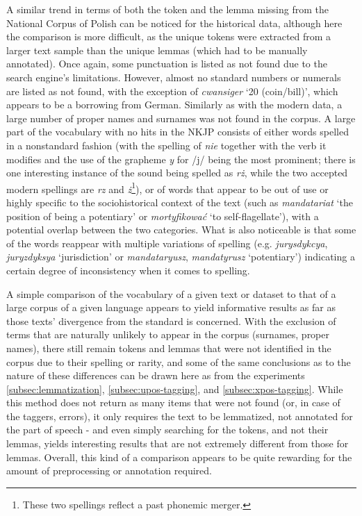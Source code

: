 A similar trend in terms of both the token and the lemma missing from the National Corpus of Polish can be noticed for the historical data, although here the comparison is more difficult, as the unique tokens were extracted from a larger text sample than the unique lemmas (which had to be manually annotated). Once again, some punctuation is listed as not found due to the search engine's limitations. However, almost no standard numbers or numerals are listed as not found, with the exception of \textit{cwansiger} `20 (coin/bill)', which appears to be a borrowing from German. Similarly as with the modern data, a large number of proper names and surnames was not found in the corpus. A large part of the vocabulary with no hits in the NKJP consists of either words spelled in a nonstandard fashion (with the spelling of \textit{nie} together with the verb it modifies and the use of the grapheme \textit{y} for /j/ being the most prominent; there is one interesting instance of the sound \textipa{/\textrtailz/} being spelled as \textit{rż}, while the two accepted modern spellings are \textit{rz} and \textit{ż}\footnote{These two spellings reflect a past phonemic merger.}), or of words that appear to be out of use or highly specific to the sociohistorical context of the text (such as \textit{mandatariat} `the position of being a potentiary' or \textit{mortyfikować} `to self-flagellate'), with a potential overlap between the two categories. What is also noticeable is that some of the words reappear with multiple variations of spelling (e.g. \textit{jurysdykcya}, \textit{juryzdyksya} `jurisdiction' or \textit{mandataryusz}, \textit{mandatyrusz} `potentiary') indicating a certain degree of inconsistency when it comes to spelling.

A simple comparison of the vocabulary of a given text or dataset to that of a large corpus of a given language appears to yield informative results as far as those texts' divergence from the standard is concerned. With the exclusion of terms that are naturally unlikely to appear in the corpus (surnames, proper names), there still remain tokens and lemmas that were not identified in the corpus due to their spelling or rarity, and some of the same conclusions as to the nature of these differences can be drawn here as from the experiments \autoref{subsec:lemmatization}, \autoref{subsec:upos-tagging}, and \autoref{subsec:xpos-tagging}. While this method does not return as many items that were not found (or, in case of the taggers, errors), it only requires the text to be lemmatized, not annotated for the part of speech - and even simply searching for the tokens, and not their lemmas, yields interesting results that are not extremely different from those for lemmas. Overall, this kind of a comparison appears to be quite rewarding for the amount of preprocessing or annotation required.